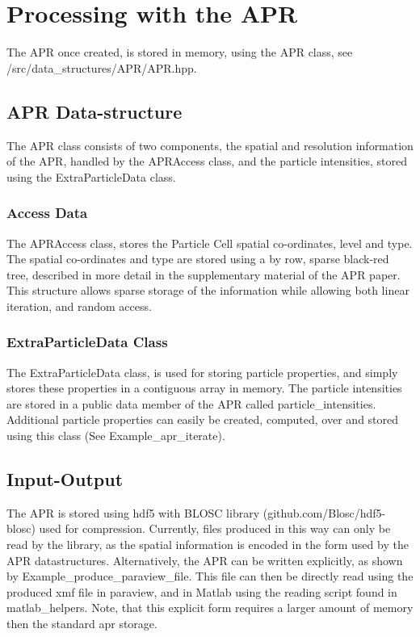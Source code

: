 \documentclass[12pt]{article}
\begin{document}
\section{Processing with the APR}
The APR once created, is stored in memory, using the APR class, see /src/data\_structures/APR/APR.hpp.
\subsection{APR Data-structure}
The APR class consists of two components, the spatial and resolution information of the APR, handled by the APRAccess class, and the particle intensities, stored using the ExtraParticleData class.
\subsubsection{Access Data}
The APRAccess class, stores the Particle Cell spatial co-ordinates, level and type. The spatial co-ordinates and type are stored using a by row, sparse black-red tree, described in more detail in the supplementary material of the APR paper. This structure allows sparse storage of the information while allowing both linear iteration, and random access.
\subsubsection{ExtraParticleData Class}
The ExtraParticleData class, is used for storing particle properties, and simply stores these properties in a contiguous array in memory. The particle intensities are stored in a public data member of the APR called particle\_intensities. Additional particle properties can easily be created, computed, over and stored using this class (See Example\_apr\_iterate).
\subsection{Input-Output}
The APR is stored using hdf5 with BLOSC library (github.com/Blosc/hdf5-blosc) used for compression. Currently, files produced in this way can only be read by the library, as the spatial information is encoded in the form used by the APR datastructures. Alternatively, the APR can be written explicitly, as shown by Example\_produce\_paraview\_file. This file can then be directly read using the produced xmf file in paraview, and in Matlab using the reading script found in matlab\_helpers. Note, that this explicit form requires a larger amount of memory then the standard apr storage.
\end{document}
